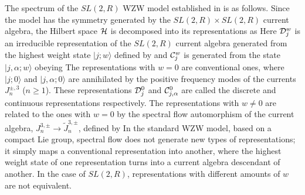 The spectrum of the $SL(2,R)$ WZW model established in
 is as follows.
Since the model has the symmetry generated by
the $SL(2,R) \times SL(2,R)$ current algebra, the
Hilbert space ${\cal H}$ is decomposed into its representations
as
\eqn{}
Here ${\cal D}_j^w$ is an irreducible representation
of the $SL(2,R)$ current algebra generated from
the highest weight state $|j; w\rangle$ defined
by
\eqn{}
and ${\cal C}_j^w$ is generated from the state
$|j, \alpha; w\rangle$ obeying
\eqn{}
The representations with $w=0$ are conventional ones,
where $|j; 0 \rangle$ and $| j, \alpha; 0\rangle$
are annihilated by the positive frequency modes
of the currents $J_n^{\pm,3}$ ($n \geq 1$).
These representations ${\cal D}_j^0$ and ${\cal C}_{j,\alpha}^0$
are called the discrete and continuous
representations respectively.
The representations with $w\neq 0$ are related
to the ones with $w=0$ by the spectral flow automorphism
of the current algebra, $J_n^{3,\pm} \rightarrow
\tilde{J}_n^{3,\pm}$, defined by
\eqn{}
In the standard WZW model, based on a compact Lie group,
 spectral flow does not generate new types of representations;
it simply maps a conventional  representation into
another, where the highest weight state of one representation
turns into a current algebra descendant of another. In the case
of $SL(2,R)$, representations with
different amounts of $w$ are not equivalent.

